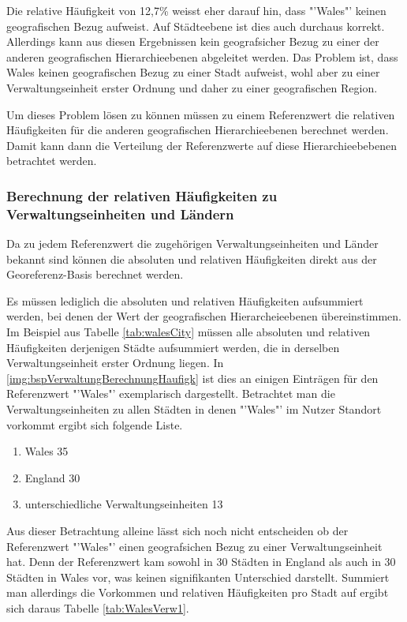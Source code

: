 			Die relative Häufigkeit von 12,7\% weisst eher darauf hin, dass "'Wales"' keinen geografischen Bezug aufweist.
			Auf Städteebene ist dies auch durchaus korrekt. 
			Allerdings kann aus diesen Ergebnissen kein geografsicher Bezug zu einer der anderen geografischen Hierarchieebenen abgeleitet werden.
			Das Problem ist, dass Wales keinen geografischen Bezug zu einer Stadt aufweist, wohl aber zu einer Verwaltungseinheit erster Ordnung und daher zu einer geografischen Region. 

			Um dieses Problem lösen zu können müssen zu einem Referenzwert die relativen Häufigkeiten für die anderen geografischen Hierarchieebenen berechnet werden.
			Damit kann dann die Verteilung der Referenzwerte auf diese Hierarchieebebenen betrachtet werden.
			
		\subsubsection{Berechnung der relativen Häufigkeiten zu Verwaltungseinheiten und Ländern} 

			Da zu jedem Referenzwert die zugehörigen Verwaltungseinheiten und Länder bekannt sind können die absoluten und relativen Häufigkeiten direkt aus der Georeferenz-Basis berechnet werden.

			Es müssen lediglich die absoluten und relativen Häufigkeiten aufsummiert werden, bei denen der Wert der geografischen Hierarcheieebenen übereinstimmen.
			Im Beispiel aus Tabelle \ref{tab:walesCity} müssen alle absoluten und relativen Häufigkeiten derjenigen Städte aufsummiert werden, die in derselben Verwaltungseinheit erster Ordnung liegen.
			In \ref{img:bspVerwaltungBerechnungHaufigk} ist dies an einigen Einträgen für den Referenzwert "'Wales"' exemplarisch dargestellt.
			Betrachtet man die Verwaltungseinheiten zu allen Städten in denen "'Wales"' im Nutzer Standort vorkommt ergibt sich folgende Liste.

			\begin{enumerate}
				\item Wales 35
				\item England 30
				\item unterschiedliche Verwaltungseinheiten 13
			\end{enumerate}

			Aus dieser Betrachtung alleine lässt sich noch nicht entscheiden ob der Referenzwert "'Wales"' einen geografsichen Bezug zu einer Verwaltungseinheit hat.
			Denn der Referenzwert kam sowohl in 30 Städten in England als auch in 30 Städten in Wales vor, was keinen signifikanten Unterschied darstellt. 
			Summiert man allerdings die Vorkommen und relativen Häufigkeiten pro Stadt auf ergibt sich daraus Tabelle \ref{tab:WalesVerw1}.


